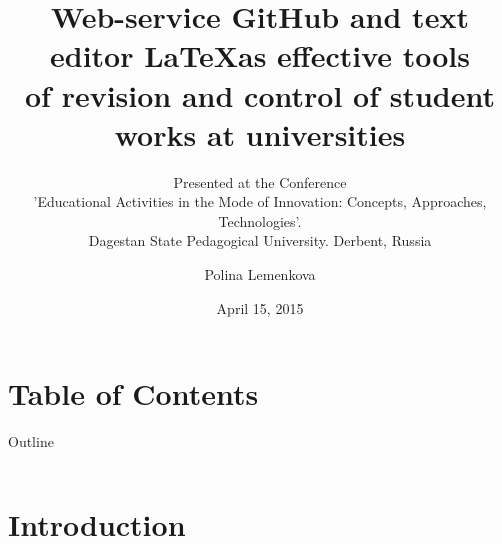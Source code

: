 \documentclass[pdflatex,compress,8pt,
	xcolor={dvipsnames,dvipsnames,svgnames,x11names,table},
	hyperref={
	breaklinks = true, 
	pdfauthor={Lemenkova Polina}, 
	pdfsubject={Preentation}, 
	pdfcreator={Lemenkova Polina}, 
	pdfproducer={Lemenkova Polina}, 
	colorlinks=true,linkcolor=blue, 
	citecolor=NavyBlue, 
	urlcolor = NavyBlue, 
	breaklinks = true}]{beamer}
\title{Web-service GitHub and text editor \LaTeX \space as 
effective tools \\
of revision and control of student works at universities}\vspace{3em}
\subtitle{
Presented at the \nth{3} Conference\\
 'Educational Activities in the Mode of Innovation: Concepts, Approaches, Technologies'.\\
Dagestan State Pedagogical University. Derbent, Russia}
\author{Polina Lemenkova}
\date{April 15, 2015}
\begin{document}
\begin{frame}
           \titlepage
\end{frame}

\section*{Table of Contents}
\begin{frame}{Outline}
    \begin{columns}[onlytextwidth,T]
        \begin{column}{.45\textwidth}
            \scriptsize{\tableofcontents[sections=1-6]}
        \end{column}
        \begin{column}{.45\textwidth}
            \scriptsize{\tableofcontents[sections=7-14]}
        \end{column}
    \end{columns}
\end{frame}

\section{Introduction}
\end{document}

